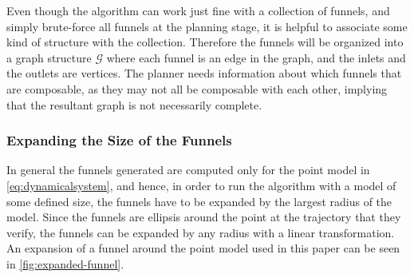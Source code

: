 Even though the \rrtfunnel{} algorithm can work just fine with a collection of
funnels, and simply brute-force all funnels at the planning stage, it is helpful
to associate some kind of structure with the collection. Therefore the funnels
will be organized into a graph structure \(\mathcal{G}\) where each funnel is an
edge in the graph, and the inlets and the outlets are vertices. The planner
needs information about which funnels that are composable, as they may not all
be composable with each other, implying that the resultant graph is not
necessarily complete.




\subsubsection{Expanding the Size of the Funnels}

In general the funnels generated are computed only for the point model in
\cref{eq:dynamicalsystem}, and hence, in order to run the algorithm with a
model of some defined size, the funnels have to be expanded by the largest
radius of the model. Since the funnels are ellipsis around the point at the
trajectory that they verify, the funnels can be expanded by any radius with a
linear transformation. An expansion of a funnel around the point model used in
this paper can be seen in \cref{fig:expanded-funnel}.

